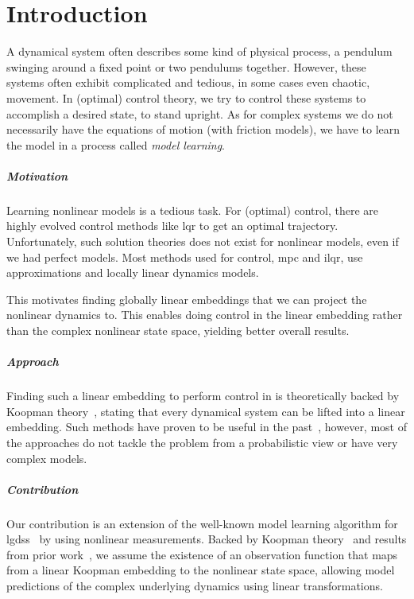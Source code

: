 \chapter{Introduction}
\label{c:introduction}



A dynamical system often describes some kind of physical process, \eg a pendulum swinging around a fixed point or two pendulums together. However, these systems often exhibit complicated and tedious, in some cases even chaotic, movement. In (optimal) control theory, we try to control these systems to accomplish a desired state, \eg to stand upright. As for complex systems we do not necessarily have the equations of motion (\eg with friction models), we have to learn the model in a process called \emph{model learning}.

\paragraph{Motivation}
	Learning nonlinear models is a tedious task. For (optimal) control, there are highly evolved control methods like \ac{lqr} to get an optimal trajectory. Unfortunately, such solution theories does not exist for nonlinear models, even if we had perfect models. Most methods used for control, \eg \ac{mpc} and \ac{ilqr}, use approximations and locally linear dynamics models.

	This motivates finding globally linear embeddings that we can project the nonlinear dynamics to. This enables doing control in the linear embedding rather than the complex nonlinear state space, yielding better overall results.

\paragraph{Approach}
	Finding such a linear embedding to perform control in is theoretically backed by Koopman theory~\cite{koopmanHamiltonianSystemsTransformation1931}, stating that every dynamical system can be lifted into a linear embedding. Such methods have proven to be useful in the past~\cite{kaiserDatadrivenDiscoveryKoopman2020,hanDeepLearningKoopman2020,mortonDeepVariationalKoopman2019a}, however, most of the approaches do not tackle the problem from a probabilistic view or have very complex models.

\paragraph{Contribution}
	Our contribution is an extension of the well-known model learning algorithm for \acp{lgds}~\cite{ghahramaniParameterEstimationLinear1996,minkaHiddenMarkovModels1999} by using nonlinear measurements. Backed by Koopman theory~\cite{koopmanHamiltonianSystemsTransformation1931} and results from prior work~\cite{luschDeepLearningUniversal2018}, we assume the existence of an observation function that maps from a linear Koopman embedding to the nonlinear state space, allowing model predictions of the complex underlying dynamics using linear transformations.

